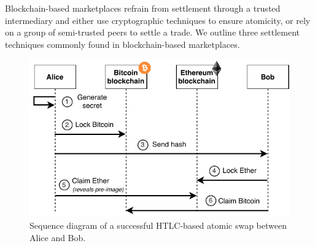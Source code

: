 
Blockchain-based marketplaces refrain from settlement through a trusted intermediary and either use cryptographic techniques to ensure atomicity, or rely on a group of semi-trusted peers to settle a trade.
We outline three settlement techniques commonly found in blockchain-based marketplaces.

\begin{figure}[t]
	\centering
	\includegraphics[width=.7\linewidth]{introduction/assets/atomic_swap}
	\caption{Sequence diagram of a successful HTLC-based atomic swap between Alice and Bob.}
	\label{fig:atomic_swap_intro}
\end{figure}

